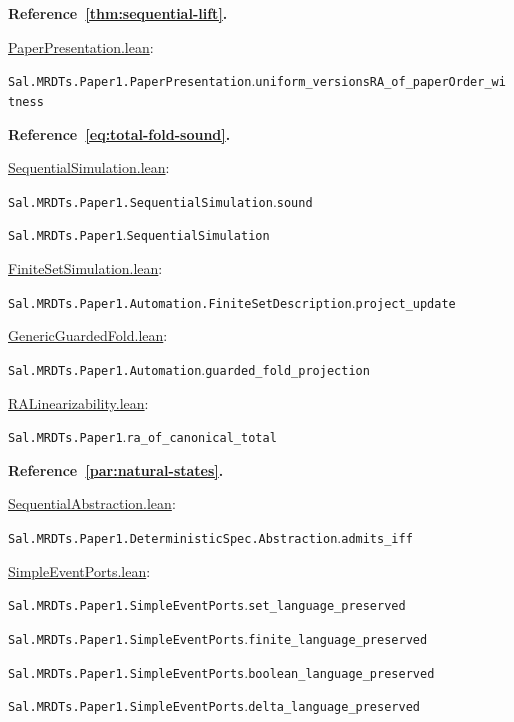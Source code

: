 \medskip\noindent\textbf{Reference~\ref{thm:sequential-lift}.}\par\nobreak
\noindent\href{https://github.com/fplaunchpad/sal/blob/paper1/Sal/MRDTs/Paper1/PaperPresentation.lean}{PaperPresentation.lean}:\par
{\small\nolinkurl{Sal.MRDTs.Paper1.PaperPresentation}.\allowbreak\nolinkurl{uniform_versionsRA_of_paperOrder_witness}}\par

\medskip\noindent\textbf{Reference~\ref{eq:total-fold-sound}.}\par\nobreak
\noindent\href{https://github.com/fplaunchpad/sal/blob/07fe525/Sal/MRDTs/Paper1/SequentialSimulation.lean}{SequentialSimulation.lean}:\par
{\small\nolinkurl{Sal.MRDTs.Paper1.SequentialSimulation}.\allowbreak\nolinkurl{sound}}\par
{\small\nolinkurl{Sal.MRDTs.Paper1}.\allowbreak\nolinkurl{SequentialSimulation}}\par
\noindent\href{https://github.com/fplaunchpad/sal/blob/paper1/Sal/MRDTs/Paper1/Automation/FiniteSetSimulation.lean}{FiniteSetSimulation.lean}:\par
{\small\nolinkurl{Sal.MRDTs.Paper1.Automation.FiniteSetDescription}.\allowbreak\nolinkurl{project_update}}\par
\noindent\href{https://github.com/fplaunchpad/sal/blob/paper1/Sal/MRDTs/Paper1/Automation/GenericGuardedFold.lean}{GenericGuardedFold.lean}:\par
{\small\nolinkurl{Sal.MRDTs.Paper1.Automation}.\allowbreak\nolinkurl{guarded_fold_projection}}\par
\noindent\href{https://github.com/fplaunchpad/sal/blob/paper1/Sal/MRDTs/Paper1/RALinearizability.lean}{RALinearizability.lean}:\par
{\small\nolinkurl{Sal.MRDTs.Paper1}.\allowbreak\nolinkurl{ra_of_canonical_total}}\par

\medskip\noindent\textbf{Reference~\ref{par:natural-states}.}\par\nobreak
\noindent\href{https://github.com/fplaunchpad/sal/blob/paper1/Sal/MRDTs/Paper1/SequentialAbstraction.lean}{SequentialAbstraction.lean}:\par
{\small\nolinkurl{Sal.MRDTs.Paper1.DeterministicSpec.Abstraction}.\allowbreak\nolinkurl{admits_iff}}\par
\noindent\href{https://github.com/fplaunchpad/sal/blob/paper1/Sal/MRDTs/Paper1/SimpleEventPorts.lean}{SimpleEventPorts.lean}:\par
{\small\nolinkurl{Sal.MRDTs.Paper1.SimpleEventPorts}.\allowbreak\nolinkurl{set_language_preserved}}\par
{\small\nolinkurl{Sal.MRDTs.Paper1.SimpleEventPorts}.\allowbreak\nolinkurl{finite_language_preserved}}\par
{\small\nolinkurl{Sal.MRDTs.Paper1.SimpleEventPorts}.\allowbreak\nolinkurl{boolean_language_preserved}}\par
{\small\nolinkurl{Sal.MRDTs.Paper1.SimpleEventPorts}.\allowbreak\nolinkurl{delta_language_preserved}}\par

